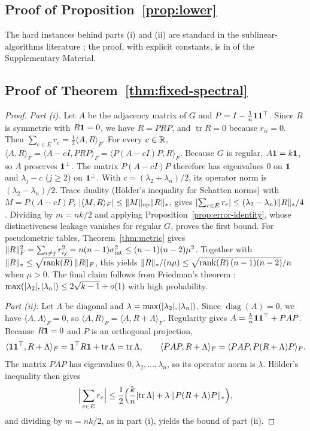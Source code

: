 \subsection{Proof of Proposition~\ref{prop:lower}}

The hard instances behind parts (i) and (ii) are standard in the sublinear-algorithms literature
\citep{barhum2007approximating,goldreich2008approximating}; the proof, with
explicit constants, is in  of the Supplementary Material.

\subsection{Proof of Theorem~\ref{thm:fixed-spectral}}

\begin{proof}
\emph{Part (i).} Let $A$ be the adjacency matrix of $G$ and $P=I-\frac1n\mathbf{1}\mathbf{1}^\top$. Since $R$ is
symmetric with $R\mathbf{1}=0$, we have $R=PRP$, and $\operatorname{tr}R=0$ because
$r_{ii}=0$. Then $\sum_{e\in E}r_e=\frac12\langle A,R\rangle_F$. For every
$c\in\mathbb{R}$, $\langle A,R\rangle_F=\langle A-cI,PRP\rangle_F=\langle P(A-cI)P,R\rangle_F$.
Because $G$ is regular, $A\mathbf{1}=k\mathbf{1}$, so $A$ preserves $\mathbf{1}^\perp$. The matrix
$P(A-cI)P$ therefore has eigenvalues $0$ on $\mathbf{1}$ and $\lambda_j-c$ ($j\ge2$) on
$\mathbf{1}^\perp$. With $c=(\lambda_2+\lambda_n)/2$, its operator norm is
$(\lambda_2-\lambda_n)/2$. Trace duality (H\"older's inequality for Schatten norms) with $M=P(A-cI)P$,
$\lvert\langle M,R\rangle_F\rvert\le\lVert M\rVert_{\mathrm{op}}\lVert R\rVert_*$, gives
$\lvert\sum_{e\in E}r_e\rvert\le(\lambda_2-\lambda_n)\lVert R\rVert_*/4$. Dividing by $m=nk/2$
and applying Proposition~\ref{prop:error-identity}, whose distinctiveness leakage vanishes for regular $G$, proves the
first bound. For pseudometric tables, Theorem~\ref{thm:metric} gives
$\lVert R\rVert_F^2=\sum_{i\neq j}r_{ij}^2={n(n-1)\sigma^2_{\mathrm{int}}}\le{(n-1)(n-2)\mu^2}$. Together with
$\lVert R\rVert_*\le\sqrt{\operatorname{rank}(R)}\,\lVert R\rVert_F$, this yields
$\lVert R\rVert_*/(n\mu)\le\sqrt{\operatorname{rank}(R)\,(n-1)(n-2)}/n$ when $\mu>0$.
The final claim follows from Friedman's theorem
\citep{friedman2008proof,bordenave2020new}:
$\max(\lvert\lambda_2\rvert,\lvert\lambda_n\rvert)\le2\sqrt{k-1}+o(1)$ with high probability.

\emph{Part (ii).} Let $\Lambda$ be diagonal and $\lambda=\max(\lvert\lambda_2\rvert,\lvert\lambda_n\rvert)$.
Since $\operatorname{diag}(A)=0$, we have $\langle A,\Lambda\rangle_F=0$, so
$\langle A,R\rangle_F=\langle A,{R+\Lambda}\rangle_F$. Regularity gives
$A=\frac kn\mathbf{1}\mathbf{1}^\top+PAP$. Because $R\mathbf{1}=0$ and $P$ is an orthogonal
projection,
\[
\langle\mathbf{1}\mathbf{1}^\top,R+\Lambda\rangle_F=\mathbf{1}^\top R\mathbf{1}+\operatorname{tr}\Lambda=\operatorname{tr}\Lambda,
\qquad
\langle PAP,R+\Lambda\rangle_F=\langle PAP,P(R+\Lambda)P\rangle_F .
\]
The matrix $PAP$ has
eigenvalues $0,\lambda_2,\dots,\lambda_n$, so its operator norm is $\lambda$. H\"older's
inequality then gives
\[
\Big|\sum_{e\in E}r_e\Big|
\le\frac12\Big(\frac kn\lvert\operatorname{tr}\Lambda\rvert
+\lambda\,\lVert P(R+\Lambda)P\rVert_*\Big),
\]
and dividing by $m=nk/2$, as in part (i), yields the bound of part (ii).
\end{proof}

